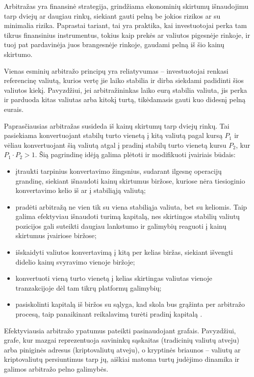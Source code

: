 \documentclass[]{VUMIFTemplateClass}
\begin{document}
Arbitražas yra finansinė strategija, grindžiama ekonominių skirtumų išnaudojimu tarp dviejų ar daugiau rinkų, siekiant gauti pelną be jokios rizikos ar su minimalia rizika. Paprastai tariant, tai yra praktika, kai investuotojai perka tam tikrus finansinius instrumentus, tokius kaip prekės ar valiutos pigesnėje rinkoje, ir tuoj pat pardavinėja juos brangesnėje rinkoje, gaudami pelną iš šio kainų skirtumo.

Vienas esminių arbitražo principų yra reliatyvumas -- investuotojai renkasi referencinę valiutą, kurios vertę jie laiko stabilia ir dirba siekdami padidinti šios valiutos kiekį. Pavyzdžiui, jei arbitražininkas laiko eurą stabilia valiuta, jis perka ir parduoda kitas valiutas arba kitokį turtą, tikėdamasis gauti kuo didesnį pelną eurais.

Paprasčiausias arbitražas susideda iš kainų skirtumų tarp dviejų rinkų. Tai pasiekiama konvertuojant stabilų turto vienetą į kitą valiutą pagal kursą $P_1$ ir vėliau konvertuojant šią valiutą atgal į pradinį stabilų turto vienetą kursu $P_2$, kur $P_1 \cdot P_2 > 1$. Šią pagrindinę idėją galima plėtoti ir modifikuoti įvairiais būdais:

\begin{itemize}
    \item įtraukti tarpinius konvertavimo žingsnius, sudarant ilgesnę operacijų grandinę, siekiant išnaudoti kainų skirtumus biržose, kuriose nėra tiesioginio konvertavimo kelio iš ar į stabiliąją valiutą;
    \item pradėti arbitražą ne vien tik su viena stabiliąja valiuta, bet su keliomis. Taip galima efektyviau išnaudoti turimą kapitalą, nes skirtingos stabilių valiutų pozicijos gali suteikti daugiau lankstumo ir galimybių reaguoti į kainų skirtumus įvairiose biržose;
    \item išskaidyti valiutos konvertavimą į kitą per kelias biržas, siekiant išvengti didelio kainų svyravimo vienoje biržoje;
    \item konvertuoti vieną turto vienetą į kelias skirtingas valiutas vienoje tranzakcijoje dėl tam tikrų platformų galimybių;
    \item pasiskolinti kapitalą iš biržos su sąlyga, kad skola bus grąžinta per arbitražo procesą, taip panaikinant reikalavimą turėti pradinį kapitalą \cite{flashloan, flashswap}.
\end{itemize}

Efektyviausia arbitražo ypatumus pateikti pasinaudojant grafais. Pavyzdžiui, grafe, kur mazgai reprezentuoja savininkų sąskaitas (tradicinių valiutų atveju) arba piniginės adresus (kriptovaliutų atveju), o kryptinės briaunos – valiutų ar kriptovaliutų persiuntimus tarp jų, aiškiai matoma turtų judėjimo dinamika ir galimos arbitražo pelno galimybės. 
\end{document}
